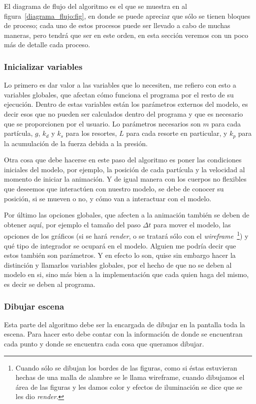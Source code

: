 El diagrama de flujo del algoritmo es el que se muestra en al figura~\ref{diagrama_flujo:fig}, en donde se puede apreciar que sólo se tienen bloques de proceso; cada uno de estos procesos puede ser llevado a cabo de muchas maneras, pero tendrá que ser en este orden, en esta sección veremos con un poco más de detalle cada proceso.

\subsubsection{Inicializar variables}
Lo primero es dar valor a las variables que lo necesiten, me refiero con esto a variables globales, que afectan cómo funciona el programa por el resto de su ejecución. Dentro de estas variables están los parámetros externos del modelo, es decir esos que no pueden ser calculados dentro del programa y que es necesario que se proporcionen por el usuario. Lo parámetros necesarios son $m$ para cada partícula, $g$, $k_d$ y $k_s$ para los resortes, $L$ para cada resorte en particular, y $k_p$ para la acumulación de la fuerza debida a la presión.

Otra cosa que debe hacerse en este paso del algoritmo es poner las condiciones iniciales del modelo, por ejemplo, la posición de cada partícula y la velocidad al momento de iniciar la animación. Y de igual manera con los cuerpos no flexibles que deseemos que interactúen con nuestro modelo, se debe de conocer su posición, si se mueven o no, y cómo van a interactuar con el modelo.

Por último las opciones globales, que afecten a la animación también se deben de obtener aquí, por ejemplo el tamaño del paso $\Delta t$ para mover el modelo, las opciones de los gráficos (si se hará \emph{\foreignlanguage{english}{render}}, o se tratará sólo con el \emph{\foreignlanguage{english}{wireframe}}~\footnote{Cuando sólo se dibujan los bordes de las figuras, como si éstas estuvieran hechas de una malla de alambre se le llama wireframe, cuando dibujamos el área de las figuras y les damos color y efectos de iluminación se dice que se les dio \emph{render}.}) y qué tipo de integrador se ocupará en el modelo. Alguien me podría decir que estos también son parámetros. Y en efecto lo son, quise sin embargo hacer la distinción y llamarlos variables globales, por el hecho de que no se deben al modelo en si, sino más bien a la implementación que cada quien haga del mismo, es decir se deben al programa.

\subsubsection{Dibujar escena}
Esta parte del algoritmo debe ser la encargada de dibujar en la pantalla toda la escena. Para hacer esto debe contar con la información de donde se encuentran cada punto y donde se encuentra cada cosa que queramos dibujar.

